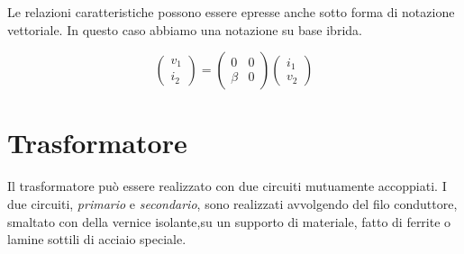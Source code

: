 \documentclass[a4paper]{report}
\begin{document}
Le relazioni caratteristiche possono essere epresse anche sotto forma
di notazione vettoriale. In questo caso abbiamo una notazione su base
ibrida.

\[
\left(
\begin{array}{c}
  v_1\\
  i_2
\end{array}
\right)=
\begin{pmatrix}
  0 & 0\\
  \beta & 0
\end{pmatrix}
\left(
\begin{array}{c}
  i_1\\
  v_2
\end{array}
\right)
\]

\section{Trasformatore}
Il trasformatore pu\`o essere realizzato con due circuiti mutuamente
accoppiati. I due circuiti, \emph{primario} e \emph{secondario}, sono
realizzati avvolgendo del filo conduttore, smaltato con della vernice
isolante,su un supporto di materiale, fatto di ferrite o lamine
sottili di acciaio speciale.
\end{document}

